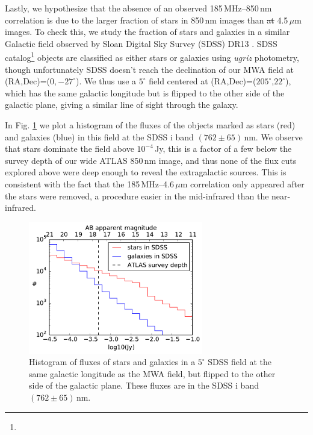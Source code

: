 \documentclass[numberedappendix]{emulateapj}
\providecommand{\DIFadd}[1]{{\protect\color{blue}\uwave{#1}}} %
\providecommand{\DIFdel}[1]{{\protect\color{red}\sout{#1}}}                      %
\providecommand{\DIFaddbegin}{} %
\providecommand{\DIFaddend}{} %
\providecommand{\DIFdelbegin}{} %
\providecommand{\DIFdelend}{} %
\begin{document}
Lastly, we hypothesize that the absence of an observed 185\,MHz--850\,nm correlation is due to the larger fraction of stars in 850\,nm images than \DIFdelbegin \DIFdel{at }\DIFdelend \DIFaddbegin \DIFadd{in }\DIFaddend 4.5\,$\mu$m images. To check this, we study the fraction of stars and galaxies in a similar Galactic field observed by Sloan Digital Sky Survey (SDSS) \citep{sdssiii} DR13 \citep{sdssdr13}. SDSS catalog\footnote{} objects are classified as either stars or galaxies using \textit{ugriz} photometry, though unfortunately SDSS doesn't reach the declination of our MWA field at (RA,Dec)=($0,-27^\circ$). We thus use a $5^\circ$ field centered at (RA,Dec)=($205^\circ$,$22^\circ$), which has the same galactic longitude but is flipped to the other side of the galactic plane, giving a similar line of sight through the galaxy.

In Fig. \ref{fig:sdssstarsgals} we plot a histogram of the fluxes of the objects marked as stars (red) and galaxies (blue) in this field at the SDSS i band $(762\pm65)$\,nm. We observe that stars dominate the field above  $10^{-4}$\,Jy, this is a factor of a few below the survey depth of our wide ATLAS 850\,nm image, and thus none of the flux cuts explored above were deep enough to reveal the extragalactic sources. This is consistent with the fact that the 185\,MHz--4.6\,$\mu$m correlation only appeared after the stars were removed, a procedure easier in the mid-infrared than the near-infrared. 

\begin{figure}[h]
\centering
\includegraphics[width=3in]{sdss_stars_galaxies_hist_l=15_b=78_500000sources.pdf}
\caption[Histogram of SDSS fluxes of stars and galaxies in a similar field to our ATLAS field.]{Histogram of fluxes of stars and galaxies in a $5^\circ$ SDSS field at the same galactic longitude as the MWA field, but flipped to the other side of the galactic plane. These fluxes are in the SDSS i band $(762\pm65)$\,nm. }
\label{fig:sdssstarsgals}
\end{figure}
\end{document}
